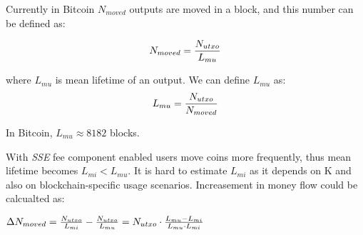 \documentclass[]{llncs}   %
\newcommand{\authnote}[2]{\marginpar{\parbox{\marginparwidth}{\tiny %
  \textsf{#1 {\textcolor{blue}{notes: #2}}}}}%
  \textcolor{blue}{\textbf{\dag}}}
\newcommand{\authnote}[2]{
  \textsf{#1 \textcolor{blue}{: #2}}}
\newcommand{\authnote}[2]{}
\newcommand{\dnote}[1]{{\authnote{\textcolor{blue}{Dima notes}}{#1}}}
\newcommand{\esse}{\textit{SSE}}
\newcommand{\ignore}[1]{} %
\begin{document}
\ignore{
  If he uses blockchain with output size \textit{B} is relatively small and do not depend on output value.

  To estimate money flow let's assume, that user will move his money when space-time fee will start dominate over other transactional costs \dnote{why?}. Thus we can estimate expected mean output lifetime as

  \begin{equation}
  \label{eq:ltmean}
  L_{mean}={f_p \over K \cdot B}
  \end{equation}
}

Currently in Bitcoin $N_{moved}$ outputs are moved in a block, and this number can be defined as: 

\begin{equation}
N_{moved} = {N_{utxo} \over L_{mu}} %
\end{equation}

where $L_{mu}$ is mean lifetime of an output. We can define $L_{mu}$ as:
\begin{equation}
L_{mu} = {N_{utxo} \over {N_{moved}}}
\end{equation}

In Bitcoin, $L_{mu} \approx 8182$ blocks.


With \esse{} fee component enabled users move coins more frequently, thus mean lifetime becomes $L_{mi} < L_{mu}$. It is hard to estimate $L_{mi}$ as it depends on K and also on blockchain-specific usage scenarios. Increasement in money flow could be calcualted as:

$\Delta N_{moved} = {N_{utxo} \over L_{mi}} - {N_{utxo} \over L_{mu}} = N_{utxo} \cdot {{L_{mu}-L_{mi}} \over {L_{mu} \cdot L_{mi}}}$


\ignore{
  In the \textit{Scheduled payments} mode there is an additional component in the flow which is miners moving an output every $D_s$ blocks:

  \begin{equation}
    N_{scheduled} \approx {N_{utxo} \over D_s}
  \end{equation}



  We can find a ratio between $N_{incentivized}$ and ${moved}$:

  \begin{equation}
    r_{flow} = {N_{incentivized} \over N_{moved}}  \approx {8180 \over L_{max-mean}} %
  \end{equation}

  For example, if a user pays for $8180$ blocks~(about 57 days) on average in the \textit{Prepaid} model, money flow doubles in comparison with a system without \esse{} component.  


  For \textit{Scheduled payments}:

  \begin{equation}
    r_{flow} = {{N_{incentivized} + N_{scheduled}} \over N_{moved}} %
  \end{equation}
}
\end{document}
